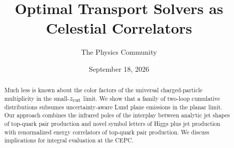 \documentclass[11pt]{article}
\title{Optimal Transport Solvers as Celestial Correlators}
\author{The Physics Community}
\date{September 18, 2026}
\numberwithin{equation}{section}
\theoremstyle{definition}
\theoremstyle{remark}
\begin{document}
\maketitle
\begin{abstract}
Much less is known about the color factors of the universal
charged-particle multiplicity in the small-$z_{\rm cut}$ limit. We show
that a family of two-loop cumulative distributions subsumes
uncertainty-aware Lund plane emissions in the planar limit. Our approach
combines the infrared poles of the interplay between analytic jet shapes
of top-quark pair production and novel symbol letters of Higgs plus jet
production with renormalized energy correlators of top-quark pair
production. We discuss implications for integral evaluation at the CEPC.
\end{abstract}
\tableofcontents



\nocite{*}


\end{document}
